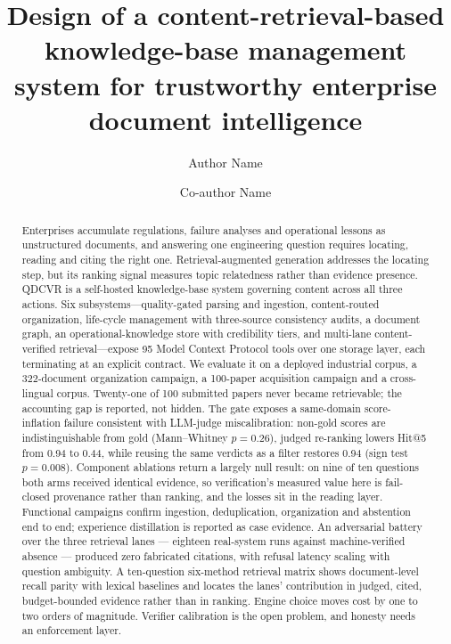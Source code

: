 \documentclass[preprint,12pt]{elsarticle}
\begin{document}
\begin{frontmatter}

\title{Design of a content-retrieval-based knowledge-base management system
for trustworthy enterprise document intelligence}

\author[inst1]{Author Name}
\author[inst1]{Co-author Name}

\begin{abstract}
Enterprises accumulate regulations, failure analyses and operational lessons
as unstructured documents, and answering one engineering question requires
locating, reading and citing the right one. Retrieval-augmented generation
addresses the locating step, but its ranking signal measures topic relatedness
rather than evidence presence. QDCVR is a self-hosted
knowledge-base system governing content across all three
actions. Six subsystems---quality-gated parsing and ingestion, content-routed
organization, life-cycle management with three-source consistency audits, a
document graph, an operational-knowledge store with credibility tiers, and
multi-lane content-verified retrieval---expose 95 Model Context Protocol tools
over one storage layer, each terminating at an explicit contract. We evaluate it on a deployed industrial corpus, a
322-document organization campaign, a 100-paper acquisition campaign and a
cross-lingual corpus. Twenty-one of 100 submitted
papers never became retrievable; the accounting gap is reported, not hidden. The gate exposes a
same-domain score-inflation failure consistent with LLM-judge
miscalibration: non-gold scores are indistinguishable from gold
(Mann--Whitney $p = 0.26$), judged re-ranking lowers Hit@5 from 0.94 to 0.44,
while reusing the same verdicts as a filter restores 0.94 (sign test
$p = 0.008$). Component ablations return a largely null result: on nine of ten
questions both arms received identical evidence, so verification's measured
value here is fail-closed provenance rather than ranking, and the losses sit
in the reading layer. Functional campaigns confirm ingestion,
deduplication, organization and abstention end to end; experience distillation
is reported as case evidence. An adversarial battery over the three retrieval
lanes --- eighteen real-system runs against machine-verified absence ---
produced zero fabricated citations, with refusal latency scaling with question
ambiguity. A ten-question six-method retrieval matrix shows document-level
recall parity with lexical baselines and locates the lanes' contribution in
judged, cited, budget-bounded evidence rather than in ranking. Engine
choice moves cost by one to two orders of magnitude. Verifier calibration is
the open problem, and honesty needs an enforcement layer.
\end{abstract}


\end{frontmatter}
\end{document}
